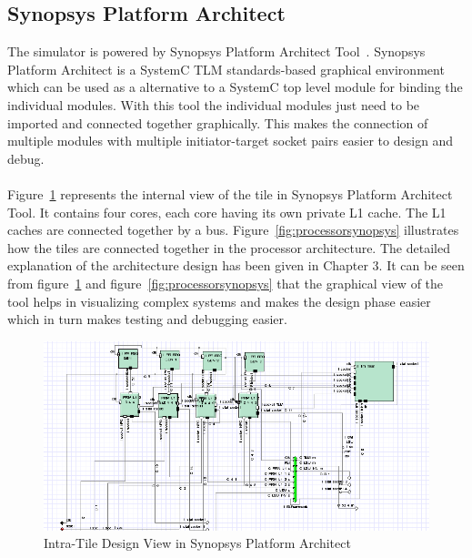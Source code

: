 \documentclass{listhesis}
\begin{document}
\subsection{Synopsys Platform Architect}
The simulator is powered by Synopsys Platform Architect Tool~\cite{synopsys}. Synopsys Platform Architect is a SystemC TLM standards-based graphical environment which can be used as a alternative to a SystemC top level module for binding the individual modules. With this tool the individual modules just need to be imported and connected together graphically. This makes the connection of multiple modules with multiple initiator-target socket pairs easier to design and debug.\\
\\ Figure~\ref{fig:insidetile} represents the internal view of the tile in Synopsys Platform Architect Tool. It contains four cores, each core having its own private L1 cache. The L1 caches are connected together by a bus. Figure~\ref{fig:processorsynopsys} illustrates how the tiles are connected together in the processor architecture. The detailed explanation of the architecture design has been given in Chapter 3. It can be seen from figure~\ref{fig:insidetile} and figure~\ref{fig:processorsynopsys} that the graphical view of the tool helps in visualizing complex systems and makes the design phase easier which in turn makes testing and debugging easier.
\begin{figure}
  \includegraphics[width=\linewidth]{insidetile.png}
  \centering
  \caption{Intra-Tile Design View in Synopsys Platform Architect}
  \label{fig:insidetile}
\end{figure}
\end{document}
